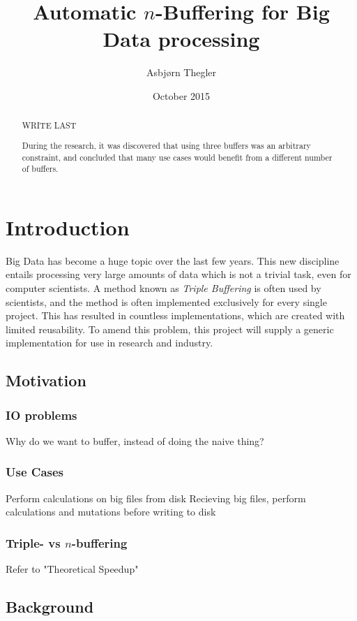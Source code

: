 \documentclass[a4paper]{article}
\title{Automatic $n$-Buffering for Big Data processing}
\author{Asbj\o rn Thegler}
\date{October 2015}
\begin{document}
\maketitle

\sloppy

\begin{abstract}
WRITE LAST

During the research, it was discovered that using three buffers was an arbitrary constraint, and
concluded that many use cases would benefit from a different number of buffers.
\end{abstract}

\tableofcontents

\section{Introduction}
Big Data has become a huge topic over the last few years. This new discipline entails
processing very large amounts of data which is not a trivial task, even for computer 
scientists. A method known as \textit{Triple Buffering} is often used by scientists,
and the method is often implemented exclusively for every single project. This has resulted
in countless implementations, which are created with limited reusability. To amend this problem,
this project will supply a generic implementation for use in research and industry.


\subsection{Motivation}
\subsubsection{IO problems}
Why do we want to buffer, instead of doing the naive thing?

\subsubsection{Use Cases}
Perform calculations on big files from disk
Recieving big files, perform calculations and mutations before writing to disk


\subsubsection{Triple- vs $n$-buffering}
Refer to "Theoretical Speedup"


\subsection{Background}
\end{document}
